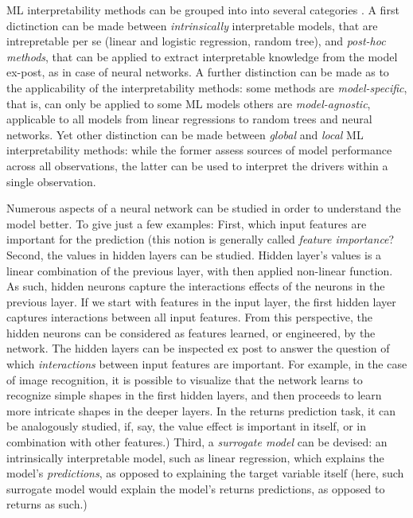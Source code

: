 		ML interpretability methods can be grouped into into several categories \citep{molnar2020interpretable}. A first dictinction can be made between  \textit{intrinsically} interpretable models, that are intrepretable per se (linear and logistic regression, random tree), and \textit{post-hoc methods}, that can be applied to extract interpretable knowledge from the model ex-post, as in case of neural networks. A further distinction can be made as to the applicability of the interpretability methods: some methods are \textit{model-specific}, that is, can only be applied to some ML models others are \textit{model-agnostic}, applicable to all models from linear regressions to random trees and neural networks. Yet other distinction can be made between \textit{global} and \textit{local} ML interpretability methods: while the former assess sources of model performance across all observations, the latter can be used to interpret the drivers within a single observation. 
		
		Numerous aspects of a neural network can be studied in order to understand the model better. To give just a few  examples: First, which input features are important for the prediction (this notion is generally called \textit{feature importance}? Second, the values in hidden layers can be studied. Hidden layer's values is a linear combination of the previous layer, with then applied non-linear function. As such, hidden neurons capture the interactions effects of the neurons in the previous layer. If we start with features in the input layer, the first hidden layer captures interactions between all input features. From this perspective, the hidden neurons can be considered as features learned, or engineered, by the network. The hidden layers can be inspected ex post to answer the question of which \textit{interactions} between input features are important. For example, in the case of image recognition, it is possible to visualize that the network learns to recognize simple shapes in the first hidden layers, and then proceeds to learn more intricate shapes in the deeper layers. In the returns prediction task, it can be analogously studied, if, say, the value effect is important in itself, or in combination with other features.) Third, a \textit{surrogate model} can be devised: an intrinsically interpretable model, such as linear regression, which explains the model's \textit{predictions}, as opposed to explaining the target variable itself (here, such surrogate model would explain the model's returns predictions, as opposed to returns as such.) 
		
